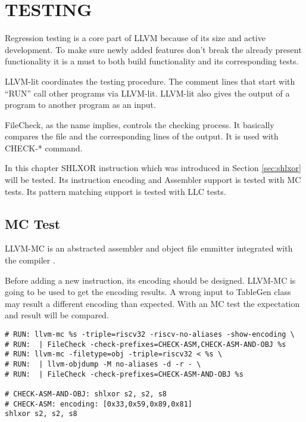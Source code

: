 \clearpage
\chapter{TESTING}\label{Ch10}
Regression testing is a core part of LLVM because of its size and active development. To make sure newly added features don’t break the already present functionality it is a must to both build functionality and its corresponding tests.

LLVM-lit coordinates the testing procedure. The comment lines that start with “RUN” call other programs via LLVM-lit. LLVM-lit also gives the output of a program to another program as an input.

FileCheck, as the name implies, controls the checking process. It basically compares the file and the corresponding lines of the output. It is used with CHECK-* command.

In this chapter SHLXOR instruction which was introduced in Section \ref{sec:shlxor} will be tested. Its instruction encoding and Assembler support is tested with MC tests. Its pattern matching support is tested with LLC tests.   
\section{MC Test}
LLVM-MC is an abstracted assembler and object file emmitter integrated with the compiler \cite{Lattner2010Apr}.

Before adding a new instruction, its encoding should be designed. LLVM-MC is going to be used to get the encoding results. A wrong input to TableGen class may result a different encoding than expected. With an MC test the expectation and result will be compared. 

\begin{minipage}{\linewidth}
\begin{lstlisting}[caption={MC Test File}, label={lst:mc_test_file} ]
# RUN: llvm-mc %s -triple=riscv32 -riscv-no-aliases -show-encoding \ 
# RUN: 	| FileCheck -check-prefixes=CHECK-ASM,CHECK-ASM-AND-OBJ %s 
# RUN: llvm-mc -filetype=obj -triple=riscv32 < %s \ 
# RUN: 	| llvm-objdump -M no-aliases -d -r - \ 
# RUN: 	| FileCheck -check-prefixes=CHECK-ASM-AND-OBJ %s 

# CHECK-ASM-AND-OBJ: shlxor s2, s2, s8 
# CHECK-ASM: encoding: [0x33,0x59,0x89,0x81] 
shlxor s2, s2, s8
\end{lstlisting}
\end{minipage}


